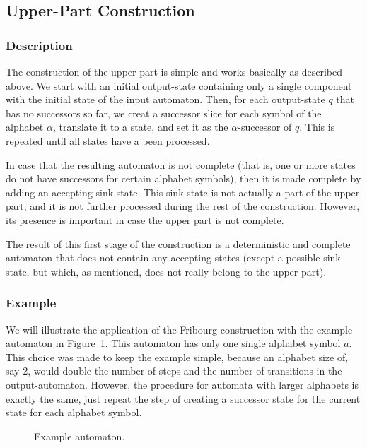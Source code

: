 \subsection{Upper-Part Construction}
\label{3_upper_part}

\subsubsection{Description}
The construction of the upper part is simple and works basically as described above. We start with an initial output-state containing only a single component with the initial state of the input automaton. Then, for each output-state $q$ that has no successors so far, we creat a successor slice for each symbol of the alphabet $\alpha$, translate it to a state, and set it as the $\alpha$-successor of $q$. This is repeated until all states have a been processed.

In case that the resulting automaton is not complete (that is, one or more states do not have successors for certain alphabet symbols), then it is made complete by adding an accepting sink state. This sink state is not actually a part of the upper part, and it is not further processed during the rest of the construction. However, its presence is important in case the upper part is not complete. 

The result of this first stage of the construction is a deterministic and complete automaton that does not contain any accepting states (except a possible sink state, but which, as mentioned, does not really belong to the upper part).


\subsubsection{Example}

We will illustrate the application of the Fribourg construction with the example automaton in Figure~\ref{example_automaton}. This automaton has only  one single alphabet symbol $a$. This choice was made to keep the example simple, because an alphabet size of, say 2, would double the number of steps and the number of transitions in the output-automaton. However, the procedure for automata with larger alphabets is exactly the same, just repeat the step of creating a successor state for the current state for each alphabet symbol.

\begin{figure}
\centering
\Automaton
\caption{Example automaton.}
\label{example_automaton}
\end{figure}

